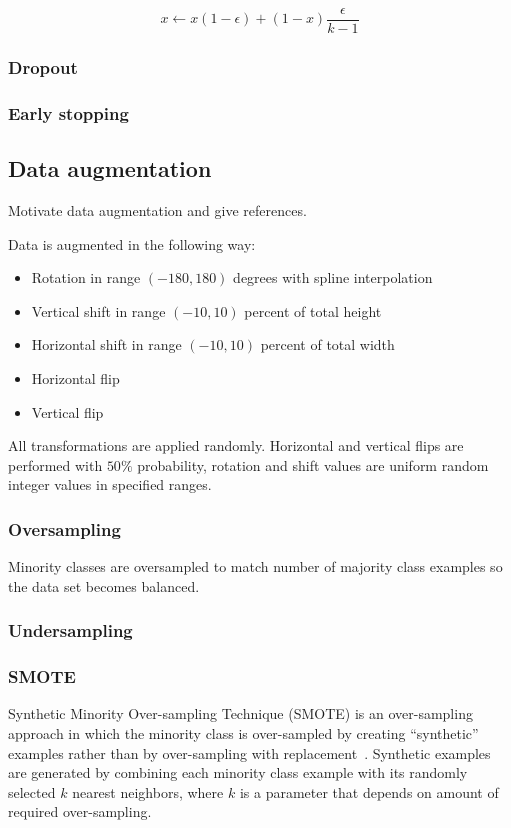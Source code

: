 \documentclass[a4paper, 11pt, table]{article}
\begin{document}
\begin{equation}
\label{eq:soft_targets}
x \leftarrow x \left( 1 - \epsilon \right) + \left(1 - x\right) \frac{\epsilon}{k - 1}
\end{equation}

\subsubsection{Dropout}

\subsubsection{Early stopping}

\subsection{Data augmentation}
Motivate data augmentation and give references.

Data is augmented in the following way:
\begin{itemize}
\item Rotation in range $(-180, 180)$ degrees with spline interpolation
\item Vertical shift in range $(-10, 10)$ percent of total height
\item Horizontal shift in range $(-10, 10)$ percent of total width
\item Horizontal flip
\item Vertical flip
\end{itemize}

All transformations are applied randomly. Horizontal and vertical flips are performed with $50\%$ probability, rotation and shift values are uniform random integer values in specified ranges. 

\subsubsection{Oversampling}
Minority classes are oversampled to match number of majority class examples so the data set becomes balanced.

\subsubsection{Undersampling}

\subsubsection{SMOTE}
Synthetic Minority Over-sampling Technique (SMOTE) is an over-sampling approach in which the minority class is over-sampled by creating “synthetic” examples rather than by over-sampling with replacement~\cite{smote_chawla}. 
Synthetic examples are generated by combining each minority class example with its randomly selected $k$ nearest neighbors, where $k$ is a parameter that depends on amount of required over-sampling.
\end{document}
